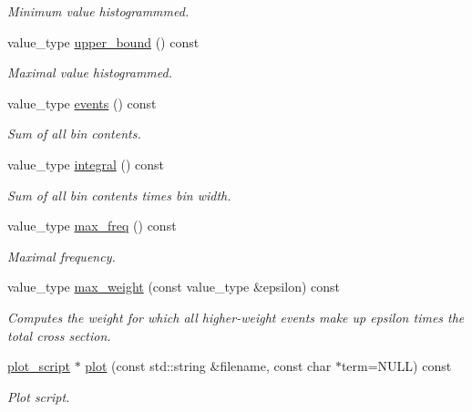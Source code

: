 \begin{DoxyCompactItemize}
\begin{DoxyCompactList}\small\item\em Minimum value histogrammmed. \end{DoxyCompactList}\item 
\hypertarget{a00576_a7157c09ebc3d0eab093075c027cc70bf}{value\-\_\-type \hyperlink{a00576_a7157c09ebc3d0eab093075c027cc70bf}{upper\-\_\-bound} () const }\label{a00576_a7157c09ebc3d0eab093075c027cc70bf}

\begin{DoxyCompactList}\small\item\em Maximal value histogrammed. \end{DoxyCompactList}\item 
\hypertarget{a00576_ad978b54ae1fd228c547e9b65fb2fa8bd}{value\-\_\-type \hyperlink{a00576_ad978b54ae1fd228c547e9b65fb2fa8bd}{events} () const }\label{a00576_ad978b54ae1fd228c547e9b65fb2fa8bd}

\begin{DoxyCompactList}\small\item\em Sum of all bin contents. \end{DoxyCompactList}\item 
\hypertarget{a00576_afe3d42e15eeef2c8720484eb7e69f79e}{value\-\_\-type \hyperlink{a00576_afe3d42e15eeef2c8720484eb7e69f79e}{integral} () const }\label{a00576_afe3d42e15eeef2c8720484eb7e69f79e}

\begin{DoxyCompactList}\small\item\em Sum of all bin contents times bin width. \end{DoxyCompactList}\item 
\hypertarget{a00576_a4aac02b910231940ba7a86545002d79c}{value\-\_\-type \hyperlink{a00576_a4aac02b910231940ba7a86545002d79c}{max\-\_\-freq} () const }\label{a00576_a4aac02b910231940ba7a86545002d79c}

\begin{DoxyCompactList}\small\item\em Maximal frequency. \end{DoxyCompactList}\item 
value\-\_\-type \hyperlink{a00576_a8ac6da412698412ff7ea54f3cd5f3595}{max\-\_\-weight} (const value\-\_\-type \&epsilon) const 
\begin{DoxyCompactList}\small\item\em Computes the weight for which all higher-\/weight events make up epsilon times the total cross section. \end{DoxyCompactList}\item 
\hypertarget{a00576_a0e1b046ad4fb04b7ddd15461807a0943}{\hyperlink{a00426}{plot\-\_\-script} $\ast$ \hyperlink{a00576_a0e1b046ad4fb04b7ddd15461807a0943}{plot} (const std\-::string \&filename, const char $\ast$term=N\-U\-L\-L) const }\label{a00576_a0e1b046ad4fb04b7ddd15461807a0943}

\begin{DoxyCompactList}\small\item\em Plot script. \end{DoxyCompactList}\end{DoxyCompactItemize}

